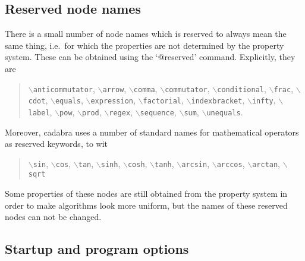 \documentclass[11pt]{article}
\newcommand{\cdb}{{cadabra}\xspace}
\newenvironment{reserved}{\par\noindent\description}{\enddescription}
\newcommand{\texcommand}[1]{{\tt $\backslash$#1}}
\numberwithin{equation}{section}
\begin{document}
\subsection{Reserved node names}
\label{s:reserved_names}

There is a small number of node names which is reserved to always mean
the same thing, i.e.~for which the properties are not determined by
the property system. These can be obtained using the `@reserved'
command. Explicitly, they are
%
%
\begin{quote}
\texcommand{anticommutator},
\texcommand{arrow},
\texcommand{comma}, 
\texcommand{commutator}, 
\texcommand{conditional},
\texcommand{frac}, 
\texcommand{cdot},
\texcommand{equals}, 
\texcommand{expression},
\texcommand{factorial},
\texcommand{indexbracket}, 
\texcommand{infty}, 
\texcommand{label},
\texcommand{pow}, 
\texcommand{prod}, 
\texcommand{regex}, 
\texcommand{sequence},
\texcommand{sum},
\texcommand{unequals}.
\end{quote}
Moreover, \cdb uses a number of standard names for mathematical
operators as reserved keywords, to wit
\begin{quote}
\texcommand{sin},
\texcommand{cos},
\texcommand{tan},
\texcommand{sinh},
\texcommand{cosh},
\texcommand{tanh},
\texcommand{arcsin},
\texcommand{arccos},
\texcommand{arctan},
\texcommand{sqrt}
\end{quote}
Some properties of these nodes are still obtained from the property
system in order to make algorithms look more uniform, but the names of
these reserved nodes can not be changed. 

\begin{reserved}



















\end{reserved}


\subsection{Startup and program options}
\end{document}
